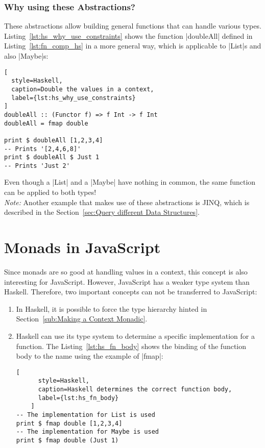\subsubsection{Why using these Abstractions?} %
\label{subsub:Why using these Abstractions?}
These abstractions allow building general functions that can handle various
types. Listing~\ref{lst:hs_why_use_constraints} shows the function |doubleAll|
defined in Listing~\ref{lst:fn_comp_hs} in a more general way, which is
applicable to |List|s and also |Maybe|s:

\begin{lstlisting}[
  style=Haskell,
  caption=Double the values in a context,
  label={lst:hs_why_use_constraints}
]
doubleAll :: (Functor f) => f Int -> f Int
doubleAll = fmap double

print $ doubleAll [1,2,3,4]
-- Prints '[2,4,6,8]'
print $ doubleAll $ Just 1
-- Prints 'Just 2'
\end{lstlisting}
Even though a |List| and a |Maybe| have nothing in common, the same function
can be applied to both types! \\ 
\textit{Note:} Another example that makes use of these abstractions is JINQ,
which is described in the Section~\ref{sec:Query different Data Structures}.

\section{Monads in JavaScript} %
\label{sec:Monads in JavaScript}
Since monads are so good at handling values in a context, this concept is also
interesting for JavaScript. However, JavaScript has a weaker type system than
Haskell. Therefore, two important concepts can not be transferred to
JavaScript: 
\begin{enumerate}
  \item In Haskell, it is possible to force the type hierarchy hinted in
    Section~\ref{sub:Making a Context Monadic}.
  \item Haskell can use its type system to determine a specific implementation
    for a function. The Listing~\ref{lst:hs_fn_body} shows the binding of the
    function body to the name using the example of |fmap|:
    \begin{lstlisting}[
      style=Haskell,
      caption=Haskell determines the correct function body,
      label={lst:hs_fn_body}
    ]
-- The implementation for List is used
print $ fmap double [1,2,3,4]
-- The implementation for Maybe is used
print $ fmap double (Just 1)
    \end{lstlisting}
\end{enumerate}


